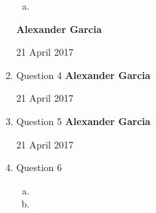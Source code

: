 \documentclass[11pt]{article}
\begin{document}
\begin{enumerate}
\begin{enumerate}[(a)]
				\item

			\end{enumerate}
\newpage
\textbf{Alexander Garcia}

21 April 2017 \\

		\item Question 4
\newpage
\textbf{Alexander Garcia}

21 April 2017 \\

		\item Question 5
\newpage
\textbf{Alexander Garcia}

21 April 2017 \\

		\item Question 6

			\begin{enumerate}[(a)]

				\item

				\item

			\end{enumerate}

	\end{enumerate}
\end{document}
